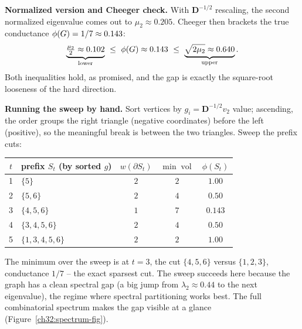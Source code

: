 \textbf{Normalized version and Cheeger check.} With $\mathbf{D}^{-1/2}$ rescaling, the second normalized eigenvalue comes out to $\mu_2\approx 0.205$. Cheeger then brackets the true conductance $\phi(G)=1/7\approx0.143$:
\[
  \underbrace{\tfrac{\mu_2}{2}\approx 0.102}_{\text{lower}}
  \ \le\
  \phi(G)\approx 0.143
  \ \le\
  \underbrace{\sqrt{2\mu_2}\approx 0.640}_{\text{upper}}.
\]
Both inequalities hold, as promised, and the gap is exactly the square-root looseness of the hard direction.

\textbf{Running the sweep by hand.} Sort vertices by $g_i=\mathbf D^{-1/2}v_2$ value; ascending, the order groups the right triangle (negative coordinates) before the left (positive), so the meaningful break is between the two triangles. Sweep the prefix cuts:

\begin{center}
\begin{tabular}{clccc}
\toprule
$t$ & prefix $S_t$ (by sorted $g$) & $w(\partial S_t)$ & $\min\operatorname{vol}$ & $\phi(S_t)$\\
\midrule
1 & $\{5\}$              & $2$ & $2$ & $1.00$\\
2 & $\{5,6\}$            & $2$ & $4$ & $0.50$\\
3 & $\{4,5,6\}$          & $1$ & $7$ & $\mathbf{0.143}$\\
4 & $\{3,4,5,6\}$        & $2$ & $4$ & $0.50$\\
5 & $\{1,3,4,5,6\}$      & $2$ & $2$ & $1.00$\\
\bottomrule
\end{tabular}
\end{center}

The minimum over the sweep is at $t=3$, the cut $\{4,5,6\}$ versus $\{1,2,3\}$, conductance $1/7$ -- the exact sparsest cut. The sweep succeeds here because the graph has a clean spectral gap (a big jump from $\lambda_2\approx0.44$ to the next eigenvalue), the regime where spectral partitioning works best. The full combinatorial spectrum makes the gap visible at a glance (Figure~\ref{ch32:spectrum-fig}).

